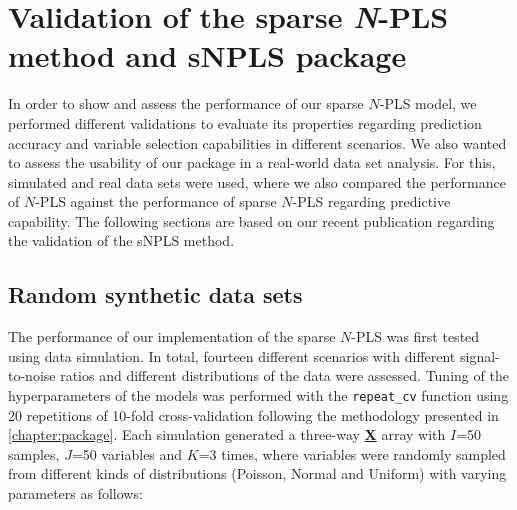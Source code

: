
\chapter[Validation of the sparse \textit{N}-PLS method and sNPLS package]{Validation of the sparse \textit{N}-PLS method and sNPLS package}
\label{chapter:validation}
In order to show and assess the performance of our sparse $N$-PLS model, we performed different validations to evaluate its properties regarding prediction accuracy and variable selection capabilities in different scenarios. We also wanted to assess the usability of our package in a real-world data set analysis. For this, simulated and real data sets were used, where we also compared the performance of $N$-PLS against the performance of sparse $N$-PLS regarding predictive capability. The following sections are based on our recent publication \parencite{hervas2018snpls} regarding the validation of the sNPLS method.


\section{Random synthetic data sets}
The performance of our implementation of the sparse $N$-PLS was first tested using data simulation. In total, fourteen different scenarios with different signal-to-noise ratios and different distributions of the data were assessed. Tuning of the hyperparameters of the models was performed with the \texttt{repeat\_cv} function using 20 repetitions of 10-fold cross-validation following the methodology presented in \autoref{chapter:package}. Each simulation generated a three-way \textbf{\underline{X}} array with $I$=50 samples, $J$=50 variables and $K$=3 times, where variables were randomly sampled from different kinds of distributions (Poisson, Normal and Uniform) with varying parameters as follows:

